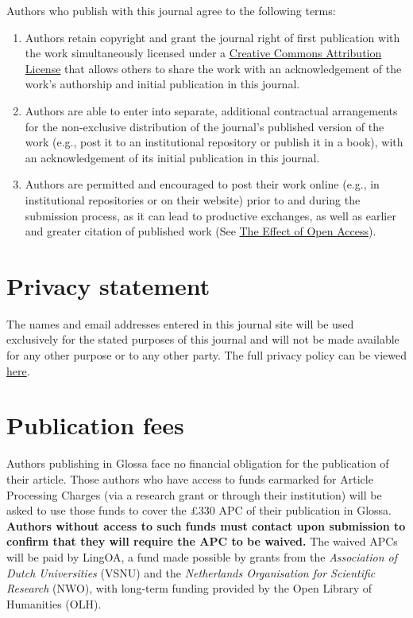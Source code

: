 \documentclass[charis,linguex]{glossa}
\begin{document}
Authors who publish with this journal agree to the following terms:

\begin{enumerate}[label=\arabic*.]
\item Authors retain copyright and grant the journal right of first publication with the work simultaneously licensed under a \href{http://creativecommons.org/licenses/by/3.0/}{Creative Commons Attribution License} that allows others to share the work with an acknowledgement of the work's authorship and initial publication in this journal.
\item Authors are able to enter into separate, additional contractual arrangements for the non-exclusive distribution of the journal's published version of the work (e.g., post it to an institutional repository or publish it in a book), with an acknowledgement of its initial publication in this journal.
\item Authors are permitted and encouraged to post their work online (e.g., in institutional repositories or on their website) prior to and during the submission process, as it can lead to productive exchanges, as well as earlier and greater citation of published work (See \href{http://opcit.eprints.org/oacitation-biblio.html}{The Effect of Open Access}).
\end{enumerate}

\section{Privacy statement}

The names and email addresses entered in this journal site will be used exclusively for the stated purposes of this journal and will not be made available for any other purpose or to any other party. The full privacy policy can be viewed \href{https://www.glossa-journal.org/about/privacy-policy/}{here}.

\section{Publication fees}

Authors publishing in Glossa face no financial obligation for the publication of their article. Those authors who have access to funds earmarked for Article Processing Charges (via a research grant or through their institution) will be asked to use those funds to cover the £330 APC of their publication in Glossa. \textbf{Authors without access to such funds must contact  upon submission to confirm that they will require the APC to be waived.} The waived APCs will be paid by LingOA, a fund made possible by grants from the \emph{Association of Dutch Universities} (VSNU) and the \emph{Netherlands Organisation for Scientific Research} (NWO), with long-term funding provided by the Open Library of Humanities (OLH).
\end{document}
